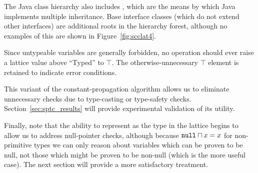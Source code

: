 \documentclass[12pt,titlepage,twoside]{article}
\newcommand{\meet}{\ensuremath{\sqcap}}
\begin{document}
The Java class hierarchy also includes , which are
the means by which Java implements multiple inheritance.  Base
interface classes (which do not extend other interfaces) are additional
roots in the hierarchy forest, although no examples of this are shown
in Figure~\ref{fig:scclat4}.

Since untypeable variables are generally forbidden, no operation
should ever raise a lattice value above ``Typed'' to $\top$.  The
otherwise-unnecessary $\top$ element is retained to indicate error
conditions.

This variant of the constant-propagation algorithm allows us to
eliminate unnecessary  checks due to type-casting or
type-safety checks.  Section~\ref{sec:sptc_results} will provide
experimental validation of its utility.

Finally, note that the ability to represent  as the
 type in the lattice begins to allow us to address
null-pointer checks, although because $\code{null} \meet x =x$ for
non-primitive types we can only reason about variables which can be
proven to be null, not those which might be proven to be non-null
(which is the more useful case).  The next section will provide a more
satisfactory treatment.
\end{document}
